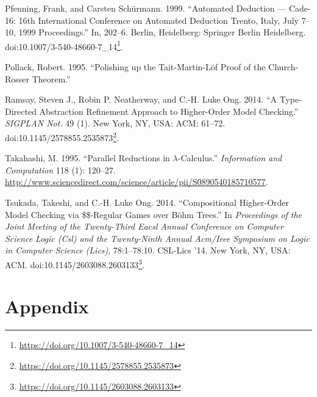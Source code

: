\documentclass[a4paper, 12pt, twoside]{style/ociamthesis}
\theoremstyle{plain}
\theoremstyle{definition}
\theoremstyle{remark}
\renewcommand{\href}[2]{#2\footnote{\url{#1}}}
\begin{document}
\hypertarget{ref-pfenning99}{}
Pfenning, Frank, and Carsten Schürmann. 1999. ``Automated Deduction ---
Cade-16: 16th International Conference on Automated Deduction Trento,
Italy, July 7--10, 1999 Proceedings.'' In, 202--6. Berlin, Heidelberg:
Springer Berlin Heidelberg.
doi:\href{https://doi.org/10.1007/3-540-48660-7_14}{10.1007/3-540-48660-7\_14}.

\hypertarget{ref-pollack95}{}
Pollack, Robert. 1995. ``Polishing up the Tait-Martin-Löf Proof of the
Church-Rosser Theorem.''

\hypertarget{ref-ramsay14}{}
Ramsay, Steven J., Robin P. Neatherway, and C.-H. Luke Ong. 2014. ``A
Type-Directed Abstraction Refinement Approach to Higher-Order Model
Checking.'' \emph{SIGPLAN Not.} 49 (1). New York, NY, USA: ACM: 61--72.
doi:\href{https://doi.org/10.1145/2578855.2535873}{10.1145/2578855.2535873}.

\hypertarget{ref-takahashi95}{}
Takahashi, M. 1995. ``Parallel Reductions in \(\lambda\)-Calculus.''
\emph{Information and Computation} 118 (1): 120--27.
\url{http://www.sciencedirect.com/science/article/pii/S0890540185710577}.

\hypertarget{ref-tsukada14}{}
Tsukada, Takeshi, and C.-H. Luke Ong. 2014. ``Compositional Higher-Order
Model Checking via \$\$-Regular Games over Böhm Trees.'' In
\emph{Proceedings of the Joint Meeting of the Twenty-Third Eacsl Annual
Conference on Computer Science Logic (Csl) and the Twenty-Ninth Annual
Acm/Ieee Symposium on Logic in Computer Science (Lics)}, 78:1--78:10.
CSL-Lics '14. New York, NY, USA: ACM.
doi:\href{https://doi.org/10.1145/2603088.2603133}{10.1145/2603088.2603133}.




\setcounter{secnumdepth}{0}
\chapter*{Appendix}\label{appendix}

\newpage

\newpage
\end{document}
